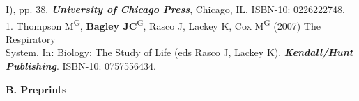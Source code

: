 \documentclass[margin,line]{res}
\begin{document}
\begin{resume}
\hspace*{8mm} I), pp. 38. {\it \textbf{University of Chicago Press}}, Chicago, IL. ISBN-10: 0226222748. \\
1. Thompson M\textsuperscript{G}, \textbf{Bagley JC}\textsuperscript{G}, Rasco J, Lackey K, Cox M\textsuperscript{G} (2007) The Respiratory\\
\hspace*{8mm} System. In: Biology: The Study of Life (eds Rasco J, Lackey K). {\it \textbf{Kendall/Hunt}\\ 
\hspace*{8mm}\textbf{Publishing}}. ISBN-10: 0757556434. 

\textbf{B. Preprints}%


\end{resume}
\end{document}
